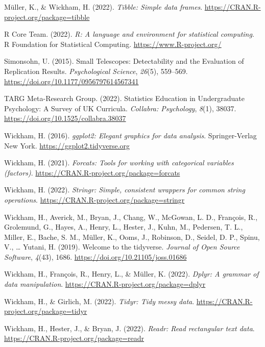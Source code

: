 \documentclass[
  man,floatsintext]{apa6}
\newlength{\cslhangindent}
\newlength{\cslentryspacingunit} %
\newenvironment{CSLReferences}[2] %
 {%
  \setlength{\parindent}{0pt}
  \ifodd #1
  \let\oldpar\par
  \def\par{\hangindent=\cslhangindent\oldpar}
  \fi
  \setlength{\parskip}{#2\cslentryspacingunit}
 }%
 {}
\begin{document}
\begin{CSLReferences}{1}{0}
\leavevmode{}%
Müller, K., \& Wickham, H. (2022). \emph{Tibble: Simple data frames}. \url{https://CRAN.R-project.org/package=tibble}

\leavevmode{}%
R Core Team. (2022). \emph{R: A language and environment for statistical computing}. R Foundation for Statistical Computing. \url{https://www.R-project.org/}

\leavevmode{}%
Simonsohn, U. (2015). Small {Telescopes}: {Detectability} and the {Evaluation} of {Replication} {Results}. \emph{Psychological Science}, \emph{26}(5), 559--569. \url{https://doi.org/10.1177/0956797614567341}

\leavevmode{}%
TARG Meta-Research Group. (2022). Statistics {Education} in {Undergraduate} {Psychology}: {A} {Survey} of {UK} {Curricula}. \emph{Collabra: Psychology}, \emph{8}(1), 38037. \url{https://doi.org/10.1525/collabra.38037}

\leavevmode{}%
Wickham, H. (2016). \emph{ggplot2: Elegant graphics for data analysis}. Springer-Verlag New York. \url{https://ggplot2.tidyverse.org}

\leavevmode{}%
Wickham, H. (2021). \emph{Forcats: Tools for working with categorical variables (factors)}. \url{https://CRAN.R-project.org/package=forcats}

\leavevmode{}%
Wickham, H. (2022). \emph{Stringr: Simple, consistent wrappers for common string operations}. \url{https://CRAN.R-project.org/package=stringr}

\leavevmode{}%
Wickham, H., Averick, M., Bryan, J., Chang, W., McGowan, L. D., François, R., Grolemund, G., Hayes, A., Henry, L., Hester, J., Kuhn, M., Pedersen, T. L., Miller, E., Bache, S. M., Müller, K., Ooms, J., Robinson, D., Seidel, D. P., Spinu, V., \ldots{} Yutani, H. (2019). Welcome to the {tidyverse}. \emph{Journal of Open Source Software}, \emph{4}(43), 1686. \url{https://doi.org/10.21105/joss.01686}

\leavevmode{}%
Wickham, H., François, R., Henry, L., \& Müller, K. (2022). \emph{Dplyr: A grammar of data manipulation}. \url{https://CRAN.R-project.org/package=dplyr}

\leavevmode{}%
Wickham, H., \& Girlich, M. (2022). \emph{Tidyr: Tidy messy data}. \url{https://CRAN.R-project.org/package=tidyr}

\leavevmode{}%
Wickham, H., Hester, J., \& Bryan, J. (2022). \emph{Readr: Read rectangular text data}. \url{https://CRAN.R-project.org/package=readr}

\end{CSLReferences}
\end{document}
